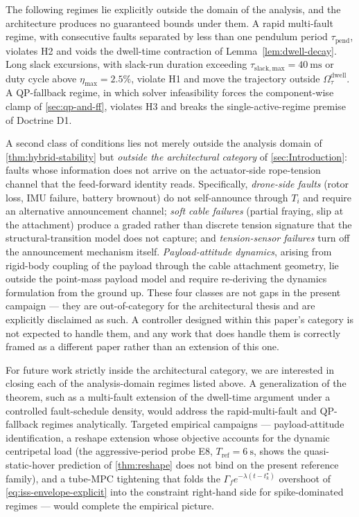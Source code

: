 The following regimes lie explicitly outside the domain of the analysis, and the architecture produces no guaranteed bounds under them. A rapid multi-fault regime, with consecutive faults separated by less than one pendulum period $\tau_{\mathrm{pend}}$, violates H2 and voids the dwell-time contraction of Lemma~\ref{lem:dwell-decay}. Long slack excursions, with slack-run duration exceeding $\tau_{\mathrm{slack,max}} = \SI{40}{\milli\second}$ or duty cycle above $\eta_{\max} = 2.5\%$, violate H1 and move the trajectory outside $\Omega_\tau^{\mathrm{dwell}}$. A QP-fallback regime, in which solver infeasibility forces the component-wise clamp of \cref{sec:qp-and-ff}, violates H3 and breaks the single-active-regime premise of Doctrine D1.

A second class of conditions lies not merely outside the analysis domain of \cref{thm:hybrid-stability} but \emph{outside the architectural category} of \cref{sec:Introduction}: faults whose information does not arrive on the actuator-side rope-tension channel that the feed-forward identity reads. Specifically, \emph{drone-side faults} (rotor loss, IMU failure, battery brownout) do not self-announce through $T_i$ and require an alternative announcement channel; \emph{soft cable failures} (partial fraying, slip at the attachment) produce a graded rather than discrete tension signature that the structural-transition model does not capture; and \emph{tension-sensor failures} turn off the announcement mechanism itself. \emph{Payload-attitude dynamics}, arising from rigid-body coupling of the payload through the cable attachment geometry, lie outside the point-mass payload model and require re-deriving the dynamics formulation from the ground up. These four classes are not gaps in the present campaign --- they are out-of-category for the architectural thesis and are explicitly disclaimed as such. A controller designed within this paper's category is not expected to handle them, and any work that does handle them is correctly framed as a different paper rather than an extension of this one.

For future work strictly inside the architectural category, we are interested in closing each of the analysis-domain regimes listed above. A generalization of the theorem, such as a multi-fault extension of the dwell-time argument under a controlled fault-schedule density, would address the rapid-multi-fault and QP-fallback regimes analytically. Targeted empirical campaigns --- payload-attitude identification, a reshape extension whose objective accounts for the dynamic centripetal load (the aggressive-period probe E8, $T_{\mathrm{ref}}=\SI{6}{\second}$, shows the quasi-static-hover prediction of \cref{thm:reshape} does not bind on the present reference family), and a tube-MPC tightening that folds the $\Gamma_f e^{-\lambda(t - t_k^\star)}$ overshoot of \eqref{eq:iss-envelope-explicit} into the constraint right-hand side for spike-dominated regimes --- would complete the empirical picture.
